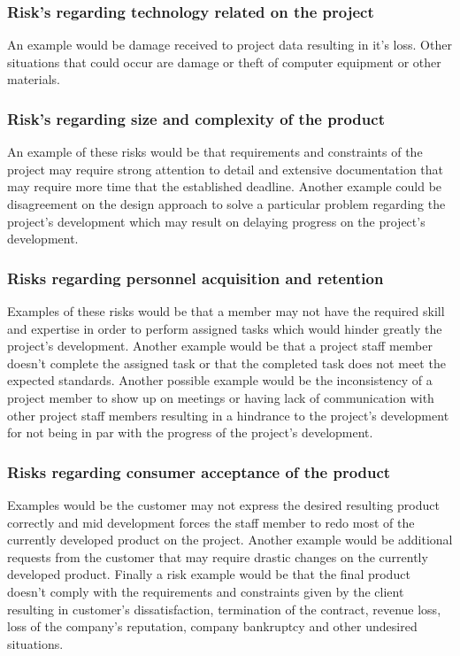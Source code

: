\documentclass[12pt]{article}
\begin{document}
\subsubsection{Risk’s regarding technology related on the project}
      An example would be damage received to project data resulting in it’s loss. Other situations that could occur are damage or theft of computer equipment or other materials.
\subsubsection{Risk’s regarding size and complexity of the product}
      An example of these risks would be that requirements and constraints of the project may require strong attention to detail and extensive documentation that may require more time that the established deadline. Another example could be disagreement on the design approach to solve a particular problem regarding the project’s development which may result on delaying progress on the project’s development.
\subsubsection{Risks regarding personnel acquisition and retention}
      Examples of these risks would be that a member may not have the required skill and expertise in order to perform assigned tasks which would hinder greatly the project’s development. Another example would be that a project staff member doesn’t complete the assigned task or that the completed task does not meet the expected standards. Another possible example would be the inconsistency of a project member to show up on meetings or having lack of communication with other project staff members resulting in a hindrance to the project’s development for not being in par with the progress of the project’s development.
\subsubsection{Risks regarding consumer acceptance of the product}
      Examples would be the customer may not express the desired resulting product correctly and mid development forces the staff member to redo most of the currently developed product on the project. Another example would be additional requests from the customer that may require drastic changes on the currently developed product.  Finally a risk example would be that the final product doesn’t comply with the requirements and constraints given by the client resulting in customer’s dissatisfaction, termination of the contract, revenue loss, loss of the company’s reputation, company bankruptcy and other undesired situations.
\end{document}
